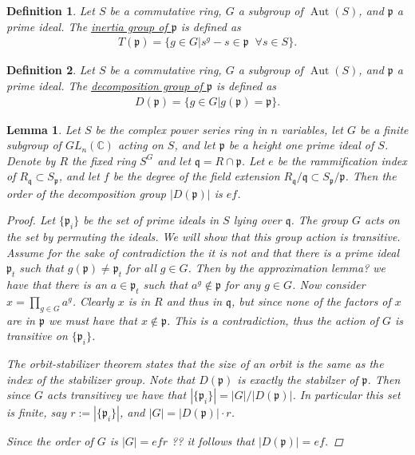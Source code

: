 \documentclass[11pt, a4paper, english]{article}
\numberwithin{prop}{section}
\newtheorem{lemma}{Lemma}
\numberwithin{lemma}{section}
\numberwithin{theorem}{section}
\newtheorem{defin}{Definition}
\numberwithin{defin}{section}
\numberwithin{example}{section}
\newcommand{\C}{\mathbb{C}}
\DeclareMathOperator{\Aut}{Aut}
\begin{document}
\begin{defin}
Let $S$ be a commutative ring, $G$ a subgroup of $\Aut(S)$, and $\mathfrak{p}$ a prime ideal. The \underline{inertia group of $\mathfrak{p}$} is defined as
\begin{align*}
T(\mathfrak{p}) = \{ g \in G | s^g - s \in \mathfrak{p} \;\; \forall s \in S \}.
\end{align*}
\end{defin}

\begin{defin}
Let $S$ be a commutative ring, $G$ a subgroup of $\Aut(S)$, and $\mathfrak{p}$ a prime ideal. The \underline{decomposition group of $\mathfrak{p}$} is defined as
\begin{align*}
D(\mathfrak{p}) = \{ g \in G | g(\mathfrak{p}) = \mathfrak{p} \}.
\end{align*}
\end{defin}

\begin{lemma}
Let $S$ be the complex power series ring in $n$ variables, let $G$ be  a finite subgroup of $GL_n(\C)$ acting on $S$, and let $\mathfrak{p}$ be a height one prime ideal of $S$. Denote by $R$ the fixed ring $S^G$ and let $\mathfrak{q} = R \cap \mathfrak{p}$. Let $e$ be the rammification index of $R_\mathfrak{q} \subset S_\mathfrak{p}$, and let $f$ be the degree of the field extension $R_\mathfrak{q}/\mathfrak{q} \subset S_\mathfrak{p}/\mathfrak{p}$. Then the order of the decomposition group $|D(\mathfrak{p})|$ is $ef$.

\begin{proof}
Let $\{ \mathfrak{p}_i \}$ be the set of prime ideals in $S$ lying over $\mathfrak{q}$. The group $G$ acts on the set by permuting the ideals. We will show that this group action is transitive. Assume for the sake of contradiction the it is not and that there is a prime ideal $\mathfrak{p}_t$ such that $g(\mathfrak{p}) \neq \mathfrak{p}_t$ for all $g \in G$. Then by the {\color{red} approximation lemma?} we have that there is an $a \in \mathfrak{p}_t$ such that $a^g \not\in \mathfrak{p}$ for any $g \in G$. Now consider $x = \prod_{g \in G} a^g$. Clearly $x$ is in $R$ and thus in $\mathfrak{q}$, but since none of the factors of $x$ are in $\mathfrak{p}$ we must have that $x \not\in \mathfrak{p}$. This is a contradiction, thus the action of $G$ is transitive on $\{ \mathfrak{p}_i \}$.

The orbit-stabilizer theorem states that the size of an orbit is the same as the index of the stabilizer group. Note that $D(\mathfrak{p})$ is exactly the stabilzer of $\mathfrak{p}$. Then since $G$ acts transitivey we have that $|\{ \mathfrak{p}_i \}| = |G|/|D(\mathfrak{p})|$. In particular this set is finite, say $r := |\{ \mathfrak{p}_i \}|$, and $|G| = |D(\mathfrak{p})|\cdot r$.

Since the order of $G$ is $|G|=efr$ {\color{red} ??} it follows that $|D(\mathfrak{p})| = ef$.
\end{proof}
\end{lemma}
\end{document}
